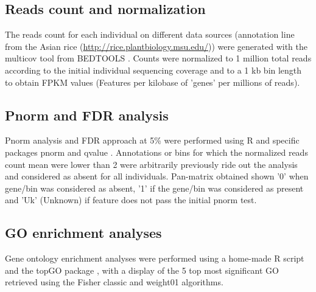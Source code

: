 \documentclass[10pt,letterpaper]{article}
\begin{document}
  
  \subsection*{Reads count and normalization}
  The reads count for each individual on different data sources (annotation line from the Asian rice (\url{http://rice.plantbiology.msu.edu/})) were generated with the multicov tool from BEDTOOLS \cite{Quinlan2014}. Counts were normalized to 1 million total reads according to the initial individual sequencing coverage and to a 1 kb bin length to obtain FPKM values (Features per kilobase of 'genes' per millions of reads).
  
  \subsection*{Pnorm and FDR analysis}
  Pnorm analysis and FDR approach at 5\% were performed using R and specific packages pnorm and qvalue \cite{Storey2015}. Annotations or bins for which the normalized reads count mean were lower than 2 were arbitrarily previously ride out the analysis and considered as absent for all individuals. Pan-matrix obtained shown '0' when gene/bin was considered as absent,  '1' if the gene/bin was considered as present and  'Uk' (Unknown) if feature does not pass the initial pnorm test.
  
  \subsection*{GO enrichment analyses}
  Gene ontology enrichment analyses were performed using a home-made R script and the topGO package \cite{Alexa2016}, with a display of the 5 top most significant GO retrieved using the Fisher classic and weight01 algorithms.
  
\end{document}
